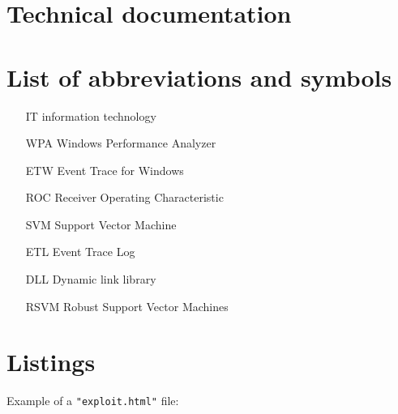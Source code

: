 \documentclass[a4paper,twoside,12pt]{book}
\begin{document}
\begin{appendices} 


\chapter*{Technical documentation}

\chapter*{List of abbreviations and symbols}

\begin{itemize}
\item[IT] information technology
\item[WPA] Windows Performance Analyzer 
\item[ETW] Event Trace for Windows 
\item[ROC] Receiver Operating Characteristic
\item[SVM] Support Vector Machine 
\item[ETL] Event Trace Log 
\item[DLL] Dynamic link library
\item[RSVM] Robust Support Vector Machines 
\end{itemize}

\chapter*{Listings}

   
Example of a \lstinline|"exploit.html"| file:


\end{appendices}
\end{document}
